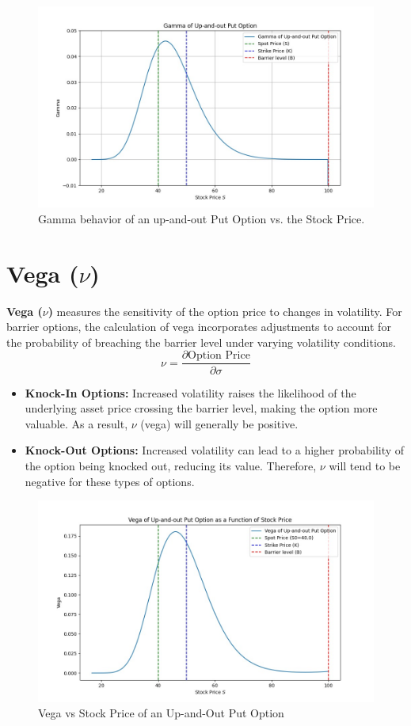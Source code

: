 \begin{figure}[h]
    \centering
    \includegraphics[width=.65\linewidth]{content/images/gamma-upout.png}
    \caption{Gamma behavior of an up-and-out Put Option vs. the Stock Price.}
    \label{fig:gamma_behavior}
\end{figure}

\section{Vega (\(\nu\))}

\textbf{Vega (\(\nu\))} measures the sensitivity of the option price to changes in volatility. For barrier options, the calculation of vega incorporates adjustments to account for the probability of breaching the barrier level under varying volatility conditions.
\[
\nu = \frac{\partial \text{Option Price}}{\partial \sigma}
\]

\begin{itemize}
    \item \textbf{Knock-In Options:} Increased volatility raises the likelihood of the underlying asset price crossing the barrier level, making the option more valuable. As a result, \(\nu\) (vega) will generally be positive.
    \item \textbf{Knock-Out Options:} Increased volatility can lead to a higher probability of the option being knocked out, reducing its value. Therefore, \(\nu\) will tend to be negative for these types of options.
\end{itemize}

\begin{figure}[H]
    \centering
    \includegraphics[width=.65\linewidth]{content/images/vega_upout.png}
    \caption{Vega vs Stock Price of an Up-and-Out Put Option}
    \label{fig:vega_behavior}
\end{figure}

